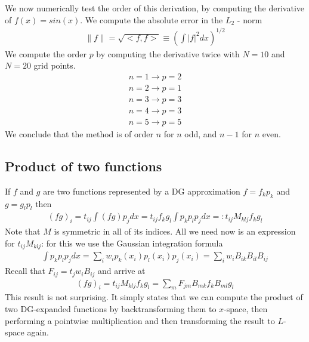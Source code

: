 \documentclass[a4paper,12pt]{scrartcl}
\begin{document}
We now numerically test the order of this derivation, by computing the derivative
of $f(x) = sin(x)$. We compute the absolute error in the $L_2$ - norm 
\begin{align}
    \lVert f\rVert = \sqrt{ <f,f>} \equiv \left( \int |f|^2 dx \right)^{1/2}
    \label{eq:norm}
\end{align}
We compute the order $p$ by computing the derivative twice with $N=10$ and $N=20$ grid
points.
\begin{align*}
    n = 1 \rightarrow p = 2 \\
    n = 2 \rightarrow p = 1 \\
    n = 3 \rightarrow p = 3 \\
    n = 4 \rightarrow p = 3 \\
    n = 5 \rightarrow p = 5
\end{align*}
We conclude that the method is of order $n$ for $n$ odd, and $n-1$ for $n$ even. 








\subsection{ Product of two functions }
If $f$ and $g$ are two functions represented by a DG approximation $f = f_kp_k$ and
$g = g_lp_l$ then 
\begin{align}
    (fg)_i = t_{ij}\int (fg)p_j dx = t_{ij} f_k g_l \int p_k p_l p_j dx =: t_{ij} M_{klj} f_k g_l
    \label{}
\end{align}
Note that $M$ is symmetric in all of its indices. All we need now is an expression for
$t_{ij}M_{klj}$: for this we use the Gaussian integration formula
\begin{align}
    \int p_k p_l p_j dx = \sum_i w_i p_k(x_i)p_l(x_i)p_j(x_i) = \sum_i w_i B_{ik}B_{il}B_{ij}
    \label{}
\end{align}
Recall that $F_{ij} = t_j w_i B_{ij}$ and arrive at
\begin{align}
    (fg)_i = t_{ij} M_{klj} f_k g_l = \sum_m F_{jm} B_{mk}f_k B_{ml}g_l
    \label{}
\end{align}
This result is not surprising. It simply states that we can compute the product
of two DG-expanded functions by backtransforming them to $x$-space, then performing
a pointwise multiplication and then transforming the result to $L$-space again.
\end{document}
